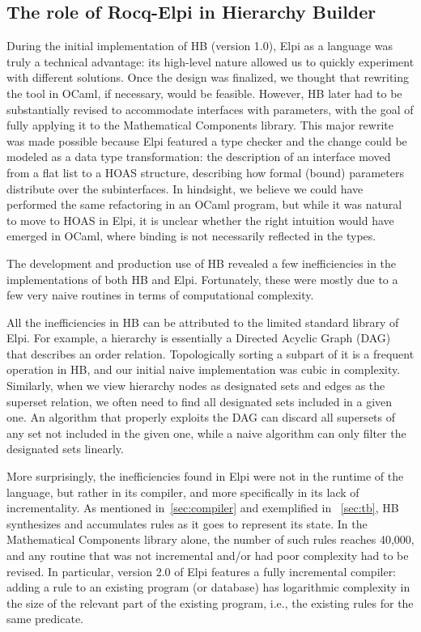 \documentclass[a4paper, 11pt]{book}
\begin{document}
\subsection{The role of Rocq-Elpi in Hierarchy Builder}

During the initial implementation of HB (version 1.0), Elpi as a language was
truly a technical advantage: its high-level nature allowed us to quickly
experiment with different solutions. Once the design was finalized, we thought
that rewriting the tool in OCaml, if necessary, would be feasible. However, HB
later had to be substantially revised to accommodate interfaces with
parameters, with the goal of fully applying it to the Mathematical Components
library. This major rewrite was made possible because Elpi featured a type
checker and the change could be modeled as a data type transformation: the
description of an interface moved from a flat list to a HOAS structure,
describing how formal (bound) parameters distribute over the subinterfaces. In
hindsight, we believe we could have performed the same refactoring in an OCaml
program, but while it was natural to move to HOAS in Elpi, it is unclear
whether the right intuition would have emerged in OCaml, where binding is not
necessarily reflected in the types.


The development and production use of HB revealed a few inefficiencies in the
implementations of both HB and Elpi. Fortunately, these were mostly due to a
few very naive routines in terms of computational complexity.

All the inefficiencies in HB can be attributed to the limited standard library
of Elpi. For example, a hierarchy is essentially a Directed Acyclic Graph
(DAG) that describes an order relation. Topologically sorting a subpart of it
is a frequent operation in HB, and our initial naive implementation was cubic
in complexity. Similarly, when we view hierarchy nodes as designated sets and
edges as the superset relation, we often need to find all designated sets
included in a given one. An algorithm that properly exploits the DAG can
discard all supersets of any set not included in the given one, while a naive
algorithm can only filter the designated sets linearly.

More surprisingly, the inefficiencies found in Elpi were not in the runtime of
the language, but rather in its compiler, and more specifically in its lack of
incrementality. As mentioned in~\cref{sec:compiler} and exemplified in
~\cref{sec:tb}, HB synthesizes and accumulates rules as it goes to represent
its state. In the Mathematical Components library alone, the number of such
rules reaches 40,000, and any routine that was not incremental and/or had poor
complexity had to be revised. In particular, version 2.0 of Elpi features a
fully incremental compiler: adding a rule to an existing program (or database)
has logarithmic complexity in the size of the relevant part of the existing
program, i.e., the existing rules for the same predicate.
\end{document}
